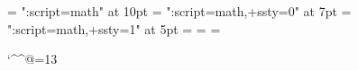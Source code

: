 %
\newfam\unimathfam %
\newfam\textfam    %

\font   \tenmath = "\mathfontname:script=math" at 10pt
\font \sevenmath = "\mathfontname:script=math,+ssty=0" at 7pt
\font  \fivemath = "\mathfontname:script=math,+ssty=1" at 5pt
\textfont         \unimathfam =   \tenmath
\scriptfont       \unimathfam = \sevenmath
\scriptscriptfont \unimathfam =  \fivemath

\let\mathalpha\mathord
\def\mathfence{F}
\def\mathaccentwide{Awo}
\def\mathaccentoverlay{Awo}
\def\mathover{O}
\def\mathunder{U}
\def\mathbotaccent{bA}
\def\mathbotaccentwide{bAw}

\begingroup%
  \catcode`\^^@=13
  \protected\gdef\@activedef#1#2{\begingroup%
    \lccode`\^^@=#1
    \lowercase{\endgroup\gdef^^@{#2}}}%
\endgroup%

